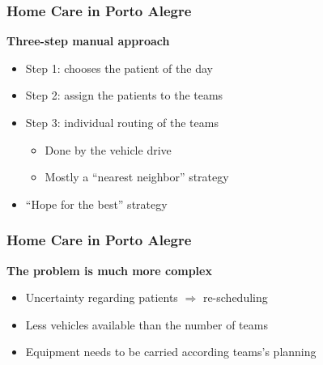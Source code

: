 \begin{frame}
   \frametitle{Home Care in Porto Alegre}


   \textbf{Three-step manual approach}
   \begin{itemize}
      \item Step 1: chooses the patient of the day
      \item Step 2: assign the patients to the teams
      \item Step 3: individual routing of the teams
      \begin{itemize}
         \item Done by the vehicle drive
         \item Mostly a ``nearest neighbor'' strategy
      \end{itemize}
      \item ``Hope for the best'' strategy
   \end{itemize}

\end{frame}

\begin{frame}
   \frametitle{Home Care in Porto Alegre}

   \textbf{The problem is much more complex}
   \begin{itemize}
      \item Uncertainty regarding patients $\Rightarrow$ re-scheduling
      \item Less vehicles available than the number of teams
      \item Equipment needs to be carried according teams's planning
   \end{itemize}
\end{frame}

